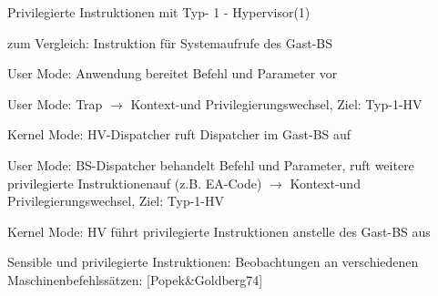 \documentclass[a4paper]{article}
\begin{document}
\begin{multicols}{3}
    \begin{itemize*}
        \item
    \end{itemize*}

    Privilegierte Instruktionen mit Typ- 1 - Hypervisor(1)

    \begin{itemize*}
        \item
        zum Vergleich: Instruktion für Systemaufrufe des Gast-BS
    \end{itemize*}

    \begin{enumerate*}
        \item
        User Mode: Anwendung bereitet Befehl und Parameter vor
        \item
        User Mode: Trap $\rightarrow$ Kontext-und
        Privilegierungswechsel, Ziel: Typ-1-HV
        \item
        Kernel Mode: HV-Dispatcher ruft Dispatcher im Gast-BS auf
        \item
        User Mode: BS-Dispatcher behandelt Befehl und Parameter, ruft weitere
        privilegierte Instruktionenauf (z.B. EA-Code)
        $\rightarrow$ Kontext-und Privilegierungswechsel,
        Ziel: Typ-1-HV
        \item
        Kernel Mode: HV führt privilegierte Instruktionen anstelle des Gast-BS
        aus
    \end{enumerate*}

    \begin{itemize*}
        \item
    \end{itemize*}

    Sensible und privilegierte Instruktionen: Beobachtungen an verschiedenen
    Maschinenbefehlssätzen: [Popek\&Goldberg74]


\end{multicols}
\end{document}
